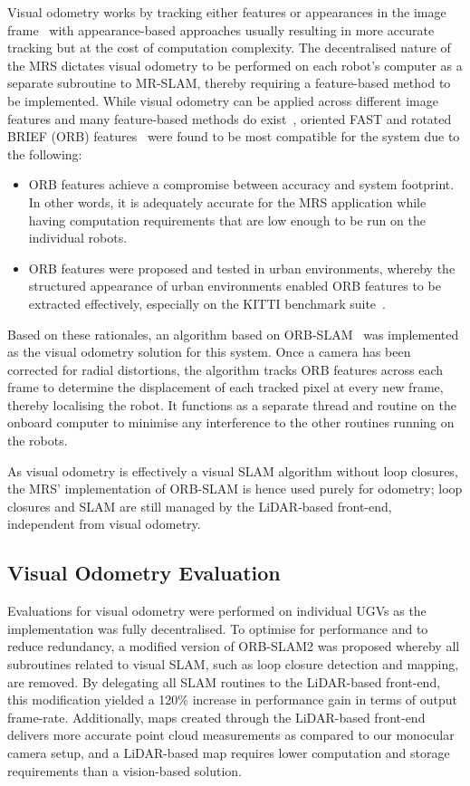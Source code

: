 Visual odometry works by tracking either features or appearances in the image frame~\cite{scaramuzza_visual_2011, yousif_overview_2015} with appearance-based approaches usually resulting in more accurate tracking but at the cost of computation complexity. The decentralised nature of the MRS dictates visual odometry to be performed on each robot’s computer as a separate subroutine to MR-SLAM, thereby requiring a feature-based method to be implemented. While visual odometry can be applied across different image features and many feature-based methods do exist~\cite{yousif_overview_2015, chien_when_2016}, oriented FAST and rotated BRIEF (ORB) features~\cite{e._rublee_orb:_2011} were found to be most compatible for the system due to the following:
\begin{itemize}
	\item ORB features achieve a compromise between accuracy and system footprint. In other words, it is adequately accurate for the MRS application while having computation requirements that are low enough to be run on the individual robots.
	\item ORB features were proposed and tested in urban environments, whereby the structured appearance of urban environments enabled ORB features to be extracted effectively, especially on the KITTI benchmark suite~\cite{geiger_are_2012}.
\end{itemize}
Based on these rationales, an algorithm based on ORB-SLAM~\cite{mur-artal_orb-slam2:_2017} was implemented as the visual odometry solution for this system. Once a camera has been corrected for radial distortions, the algorithm tracks ORB features across each frame to determine the displacement of each tracked pixel at every new frame, thereby localising the robot. It functions as a separate thread and routine on the onboard computer to minimise any interference to the other routines running on the robots.

As visual odometry is effectively a visual SLAM algorithm without loop closures, the MRS' implementation of ORB-SLAM is hence used purely for odometry; loop closures and SLAM are still managed by the LiDAR-based front-end, independent from visual odometry.

\subsection{Visual Odometry Evaluation}\label{sec:4:voe}
Evaluations for visual odometry were performed on individual UGVs as the implementation was fully decentralised. To optimise for performance and to reduce redundancy, a modified version of ORB-SLAM2 was proposed whereby all subroutines related to visual SLAM, such as loop closure detection and mapping, are removed. By delegating all SLAM routines to the LiDAR-based front-end, this modification yielded a 120\% increase in performance gain in terms of output frame-rate. Additionally, maps created through the LiDAR-based front-end delivers more accurate point cloud measurements as compared to our monocular camera setup, and a LiDAR-based map requires lower computation and storage requirements than a vision-based solution.

